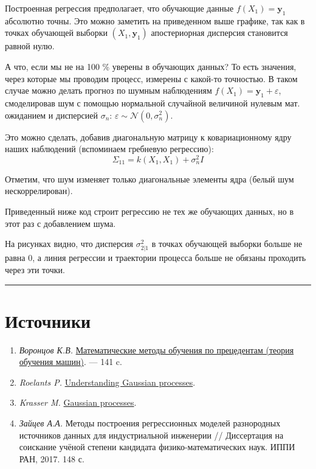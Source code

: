 \documentclass[11pt,a4paper]{article}
\providecommand{\tightlist}{%
      \setlength{\itemsep}{0pt}\setlength{\parskip}{0pt}}
\begin{document}
    Построенная регрессия предполагает, что обучающие данные
\(f(X_1) = \mathbf{y}_1\) абсолютно точны. Это можно заметить на
приведенном выше графике, так как в точках обучающей выборки
\((X_1,\mathbf{y}_1)\) апостериорная дисперсия становится равной нулю.

А что, если мы не на 100 \% уверены в обучающих данных? То есть
значения, через которые мы проводим процесс, измерены с какой-то
точностью. В таком случае можно делать прогноз по шумным наблюдениям
\(f(X_1) = \mathbf{y}_1 + \varepsilon\), смоделировав шум с помощью
нормальной случайной величиной нулевым мат. ожиданием и дисперсией
\(\sigma_n\): \(\varepsilon \sim \mathcal{N}(0, \sigma_n^2)\).

Это можно сделать, добавив диагональную матрицу к ковариационному ядру
наших наблюдений (вспоминаем гребневую регрессию):
\[
  \Sigma_{11} = k(X_1,X_1) + \sigma_n^2 I
\]

Отметим, что шум изменяет только диагональные элементы ядра (белый шум
нескоррелирован).

    Приведенный ниже код строит регрессию не тех же обучающих данных, но в
этот раз с добавлением шума.

На рисунках видно, что дисперсия \(\sigma_{2|1}^2\) в точках обучающей
выборки больше не равна 0, а линия регрессии и траектории процесса
больше не обязаны проходить через эти точки.


    \begin{center}
    \end{center}
    
    \begin{center}\rule{0.5\linewidth}{0.5pt}\end{center}

    \hypertarget{ux438ux441ux442ux43eux447ux43dux438ux43aux438}{%
\section{Источники}\label{ux438ux441ux442ux43eux447ux43dux438ux43aux438}}

\begin{enumerate}
\def\labelenumi{\arabic{enumi}.}
\tightlist
\item
  \emph{Воронцов К.В.}
  \href{http://www.machinelearning.ru/wiki/images/6/6d/Voron-ML-1.pdf}{Математические
  методы обучения по прецедентам (теория обучения машин)}. --- 141 c.
\item
  \emph{Roelants P.}
  \href{https://peterroelants.github.io/posts/gaussian-process-tutorial/}{Understanding
  Gaussian processes}.
\item
  \emph{Krasser M.}
  \href{http://krasserm.github.io/2018/03/19/gaussian-processes/}{Gaussian
  processes}.
\item
  \emph{Зайцев А.А.} Методы построения регрессионных моделей разнородных
  источников данных для индустриальной инженерии // Диссертация на
  соискание учёной степени кандидата физико-математических наук. ИППИ
  РАН, 2017. 148 с.
\end{enumerate}




    
    
    
\end{document}
